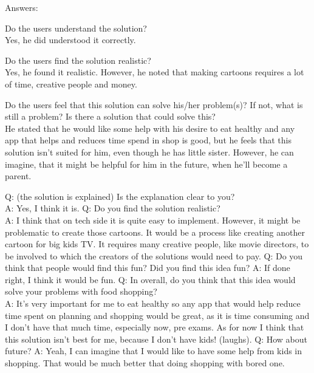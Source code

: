 \documentclass[a4paper,10pt,oneside]{scrreprt}
\begin{document}
Answers:
\begin{compactitem}
	\item Do the users understand the solution?\\
		Yes, he did understood it correctly.\\
	
	\item Do the users find the solution realistic?\\
		Yes, he found it realistic. However, he noted that making cartoons requires a lot of time, creative people and money.\\
		
	\item Do the users feel that this solution can solve his/her problem(s)? If not, what is still
	a problem? Is there a solution that could solve this?\\
		He stated that he would like some help with his desire to eat healthy and any app that helps and reduces time spend in shop is good, but he feels that this solution
isn't suited for him, even though he has little sister. However, he can imagine, that it might be helpful for him in the future, when he'll become a parent.

\end{compactitem}
\bigskip
Q: (the solution is explained) Is the explanation clear to you? \\
A: Yes, I think it is.
Q: Do you find the solution realistic?\\
A: I think that on tech side it is quite easy to implement. However, it might be problematic to create those cartoons. It would be a process like creating another
cartoon for big kids TV. It requires many creative people, like movie directors, to be involved to which the creators of the solutions would need to pay.
Q: Do you think that people would find this fun? Did you find this idea fun?
A: If done right, I think it would be fun.
Q: In overall, do you think that this idea would solve your problems with food shopping?\\
A: It's very important for me to eat healthy so any app that would help reduce time spent on planning and shopping would be great, as it is time consuming and I don't
have that much time, especially now, pre exams. As for now I think that this solution isn't best for me, because I don't have kids! (laughs). 
Q: How about future?
A: Yeah, I can imagine that I would like to have some help from kids in shopping. That would be much better that doing shopping with bored one.
\end{document}
